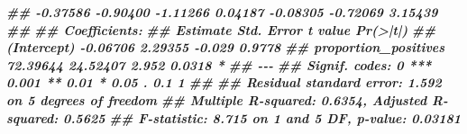 \documentclass[
  11pt,
  oneside]{book}
\newenvironment{Shaded}{\begin{snugshade}}{\end{snugshade}}
\newcommand{\DocumentationTok}[1]{\textcolor[rgb]{0.56,0.35,0.01}{\textbf{\textit{#1}}}}
\begin{document}
\begin{Shaded}
\begin{Highlighting}[]
\DocumentationTok{\#\# {-}0.37586 {-}0.90400 {-}1.11266  0.04187 {-}0.08305 {-}0.72069  3.15439 }
\DocumentationTok{\#\# }
\DocumentationTok{\#\# Coefficients:}
\DocumentationTok{\#\#                      Estimate Std. Error t value Pr(\textgreater{}|t|)  }
\DocumentationTok{\#\# (Intercept)          {-}0.06706    2.29355  {-}0.029   0.9778  }
\DocumentationTok{\#\# proportion\_positives 72.39644   24.52407   2.952   0.0318 *}
\DocumentationTok{\#\# {-}{-}{-}}
\DocumentationTok{\#\# Signif. codes:  0 \textquotesingle{}***\textquotesingle{} 0.001 \textquotesingle{}**\textquotesingle{} 0.01 \textquotesingle{}*\textquotesingle{} 0.05 \textquotesingle{}.\textquotesingle{} 0.1 \textquotesingle{} \textquotesingle{} 1}
\DocumentationTok{\#\# }
\DocumentationTok{\#\# Residual standard error: 1.592 on 5 degrees of freedom}
\DocumentationTok{\#\# Multiple R{-}squared:  0.6354, Adjusted R{-}squared:  0.5625 }
\DocumentationTok{\#\# F{-}statistic: 8.715 on 1 and 5 DF,  p{-}value: 0.03181}


\end{Highlighting}
\end{Shaded}
\end{document}
